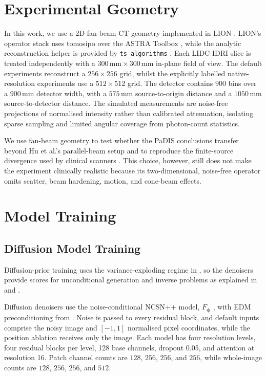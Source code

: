 \section{Experimental Geometry}
In this work, we use a 2D fan-beam CT geometry implemented in LION \cite{kiss_benchmarking_2025,noauthor_cambridgecialion_2026}. LION's operator stack uses tomosipo \cite{hendriksen_tomosipo_2021} over the ASTRA Toolbox \cite{van_aarle_fast_2016}, while the analytic reconstruction helper is provided by \texttt{ts\_algorithms} \cite{hendriksen_ahendriksents_algorithms_2026}. Each LIDC-IDRI slice is treated independently with a $300\,\mathrm{mm}\times300\,\mathrm{mm}$ in-plane field of view. The default experiments reconstruct a $256\times 256$ grid, whilst the explicitly labelled native-resolution experiments use a $512\times 512$ grid. The detector contains $900$ bins over a $900\, \mathrm{mm}$ detector width, with a $575\,\mathrm{mm}$ source-to-origin distance and a $1050\,\mathrm{mm}$ source-to-detector distance. The simulated measurements are noise-free projections of normalised intensity rather than calibrated attenuation, isolating sparse sampling and limited angular coverage from photon-count statistics.

We use fan-beam geometry to test whether the PaDIS conclusions transfer beyond Hu et al.'s parallel-beam setup and to reproduce the finite-source divergence used by clinical scanners \cite{wunderlich_image_2008}. This choice, however, still does not make the experiment clinically realistic because its two-dimensional, noise-free operator omits scatter, beam hardening, motion, and cone-beam effects.

\section{Model Training}
\label{sec:methods-model-training}

\subsection{Diffusion Model Training}
Diffusion-prior training uses the variance-exploding regime in , so the denoisers provide scores for unconditional generation and inverse problems as explained in  and .

Diffusion denoisers use the noise-conditional NCSN++ model, $F_{\boldsymbol{\phi}}$ \cite{song_score-based_2020-1}, with EDM preconditioning from . Noise is passed to every residual block, and default inputs comprise the noisy image and $[-1,1]$ normalised pixel coordinates, while the position ablation receives only the image. Each model has four resolution levels, four residual blocks per level, 128 base channels, dropout 0.05, and attention at resolution 16. Patch channel counts are $128$, $256$, $256$, and $256$, while whole-image counts are $128$, $256$, $256$, and $512$.

